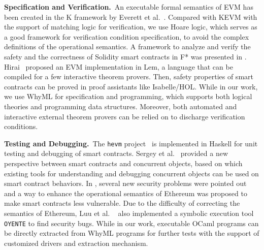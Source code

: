 \documentclass[runningheads]{llncs}
\begin{document}
\noindent\textbf{Specification and Verification.}~An executable formal semantics of EVM has been 
created in the K framework by Everett et al.~\cite{hildenbrandt2017kevm}. 
Compared with KEVM with the support
of matching logic for verification, we use Hoare logic, which serves as a good framework for
verification condition specification, to avoid the complex definitions
of the operational semantics. 
A framework to analyze and verify the safety and the correctness of 
Solidity smart contracts in F*
was presented in \cite{bhargavan2016formal}.
Hirai~\cite{hirai2017defining} proposed an EVM implementation in Lem, a language that can be compiled for 
a few interactive theorem provers. Then, safety properties of smart contracts can be proved in proof assistants like Isabelle/HOL.
While in our work, we use WhyML for specification and programming, which supports both logical theories 
and programming data structures. Moreover, both automated and interactive external theorem provers 
can be relied on to discharge verification conditions. 

\noindent\textbf{Testing and Debugging.}~The \texttt{hevm} project~\cite{hevm} is implemented in Haskell for unit testing and debugging of smart contracts.
Sergey et al.~\cite{sergey2017concurrent} provided a new perspective between smart contracts and concurrent objects,
based on which existing tools for understanding and
debugging concurrent objects can be used on smart contract behaviors. 
In \cite{luu2016making}, several new security problems were pointed out and a way to enhance the operational semantics of 
Ethereum was proposed to make smart contracts less vulnerable. 
Due to the difficulty of correcting the semantics of Ethereum, Luu et al.
~\cite{luu2016making} also implemented a symbolic execution tool \texttt{OYENTE} to find security bugs.
While in our work, executable OCaml programs can be directly extracted from WhyML programs for further tests 
with the support of customized drivers and extraction mechanism.
 
\end{document}
